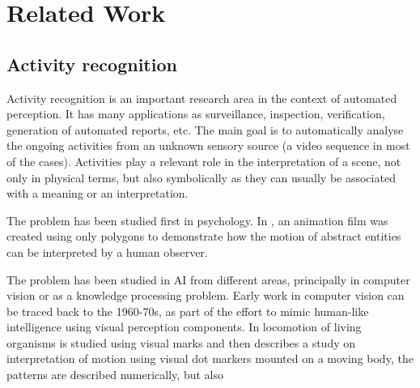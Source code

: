 \documentclass[a4paper, 12pt, openany, oneside]{book}
\begin{document}
\pagestyle{emty} %

\cleardoublepage

\newpage
{}
\tableofcontents

\newpage
\pagestyle{plain}

\chapter{Related Work}


\section{Activity recognition}

Activity recognition is an important research area in the context of automated perception. 
It has many applications as surveillance, inspection, verification, generation of automated reports, etc. 
The main goal is to automatically analyse the ongoing activities from an unknown sensory source (a video sequence in most of the cases).
Activities play a relevant role in the interpretation of a scene, not only in physical terms, but also symbolically as they can usually be associated with a meaning or an interpretation.

The problem has been studied first in psychology. In \citep{Heider1944_Experimental}, an animation film was created using only polygons to demonstrate how the motion of abstract entities can be interpreted by a human observer.

The problem has been studied in AI from different areas, principally in computer vision or as a knowledge processing problem. 
Early work in computer vision can be traced back to the 1960-70s, as part of the effort to mimic human-like intelligence using visual perception components. In \citet{Johansson1973_VisualPer} locomotion of living organisms is studied using visual marks and then describes a study on interpretation of motion using visual dot markers mounted on a moving body, the patterns are described numerically, but also
\end{document}
